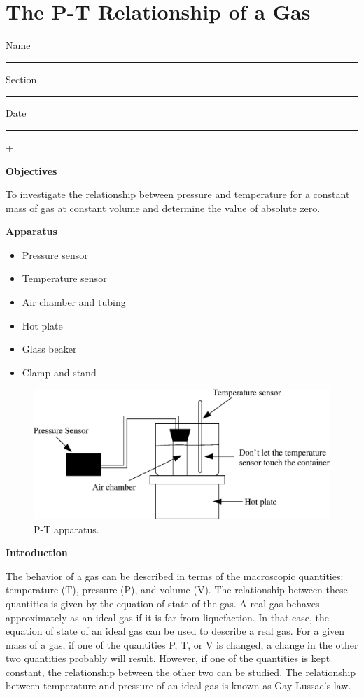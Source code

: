 
\section{The P-T Relationship of a Gas}

Name \rule{2.0in}{0.1pt}\hfill{}Section \rule{1.0in}{0.1pt}\hfill{}Date
\rule{1.0in}{0.1pt}+

\textbf{Objectives} 

To investigate the relationship between pressure and temperature for
a constant mass of gas at constant volume and determine the value
of absolute zero.

\textbf{Apparatus} 

\begin{itemize}
\item Pressure sensor
\item Temperature sensor
\item Air chamber and tubing
\item Hot plate
\item Glass beaker
\item Clamp and stand
\end{itemize}
\vspace{0.3cm}

\begin{figure}[hbt]
\begin{center}
\includegraphics[width=6.0in]{P-T_fig1b.eps}
\caption{P-T apparatus.}
\end{center}
\end{figure}

\textbf{Introduction}

The behavior of a gas can be described in terms of the macroscopic quantities:
temperature (T), pressure (P), and volume (V). The relationship between these
quantities is given by the equation of state of the gas. A real gas behaves
approximately as an ideal gas if it is far from liquefaction. In that case,
the equation of state of an ideal gas can be used to describe a real gas. For
a given mass of a gas, if one of the quantities P, T, or V is changed, a change
in the other two quantities probably will result. However, if one of the quantities
is kept constant, the relationship between the other two can be studied. The
relationship between temperature and pressure of an ideal gas is known as 
Gay-Lussac's law.

